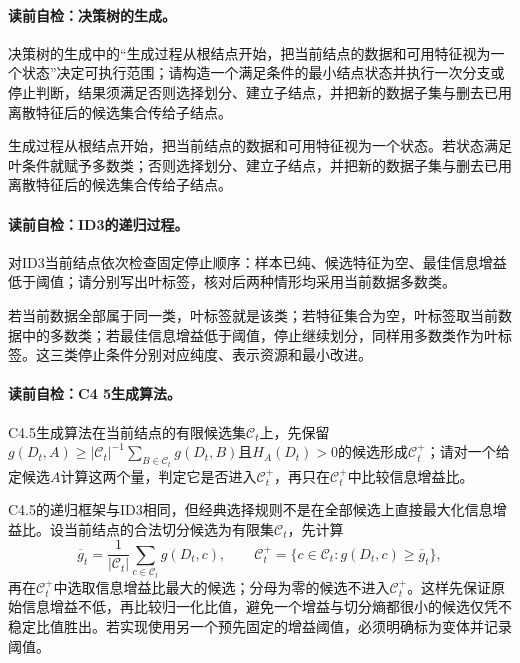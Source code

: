 \paragraph{读前自检：决策树的生成。}决策树的生成中的“生成过程从根结点开始，把当前结点的数据和可用特征视为一个状态”决定可执行范围；请构造一个满足条件的最小结点状态并执行一次分支或停止判断，结果须满足否则选择划分、建立子结点，并把新的数据子集与删去已用离散特征后的候选集合传给子结点。\par

生成过程从根结点开始，把当前结点的数据和可用特征视为一个状态。若状态满足叶条件就赋予多数类；否则选择划分、建立子结点，并把新的数据子集与删去已用离散特征后的候选集合传给子结点。

\paragraph{读前自检：ID3的递归过程。}对ID3当前结点依次检查固定停止顺序：样本已纯、候选特征为空、最佳信息增益低于阈值；请分别写出叶标签，核对后两种情形均采用当前数据多数类。\par

若当前数据全部属于同一类，叶标签就是该类；若特征集合为空，叶标签取当前数据中的多数类；若最佳信息增益低于阈值，停止继续划分，同样用多数类作为叶标签。这三类停止条件分别对应纯度、表示资源和最小改进。

\paragraph{读前自检：C4 5生成算法。}C4.5生成算法在当前结点的有限候选集$\mathcal C_t$上，先保留$g(D_t,A)\ge |\mathcal C_t|^{-1}\sum_{B\in\mathcal C_t}g(D_t,B)$且$H_A(D_t)>0$的候选形成$\mathcal C_t^+$；请对一个给定候选$A$计算这两个量，判定它是否进入$\mathcal C_t^+$，再只在$\mathcal C_t^+$中比较信息增益比。\par

C4.5的递归框架与ID3相同，但经典选择规则不是在全部候选上直接最大化信息增益比。设当前结点的合法切分候选为有限集$\mathcal C_t$，先计算
\[
\overline g_t=\frac{1}{|\mathcal C_t|}\sum_{c\in\mathcal C_t}g(D_t,c),
\qquad
\mathcal C_t^+=\{c\in\mathcal C_t:g(D_t,c)\geq\overline g_t\},
\]
再在$\mathcal C_t^+$中选取信息增益比最大的候选；分母为零的候选不进入$\mathcal C_t^+$。这样先保证原始信息增益不低，再比较归一化比值，避免一个增益与切分熵都很小的候选仅凭不稳定比值胜出。若实现使用另一个预先固定的增益阈值，必须明确标为变体并记录阈值。

